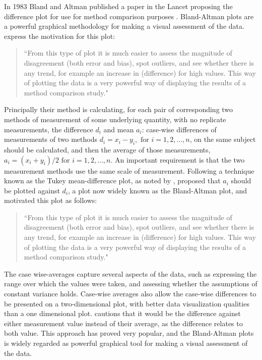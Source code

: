 \documentclass[12pt, a4paper]{report}
\theoremstyle{plain}
\theoremstyle{definition}
\theoremstyle{remark}
\begin{document}
	
In 1983 Bland and Altman published a paper in the Lancet proposing the difference plot for use for method comparison purposes \citep{BA83}. 	Bland-Altman plots are a powerful graphical methodology for making
a visual assessment of the data. \citet*{BA83} express the
motivation for this plot:
\begin{quote}
	``From this type of plot it is much easier to assess the magnitude
	of disagreement (both error and bias), spot outliers, and see
	whether there is any trend, for example an increase in
	(difference) for high values. This way of plotting the data is a
	very powerful way of displaying the results of a method comparison
	study."
\end{quote}
 Principally their method is calculating, for each pair of corresponding two methods of measurement of some underlying quantity, with no replicate measurements, the difference $d_i$ and mean $a_i$: case-wise differences of measurements of two methods $d_{i} = x_{i}-y_{i}, \mbox{ for }i=1,2,\dots,n$, on the same subject
should be calculated, and then the average of those measurements, 
$a_{i} = (x_{i} + y_{i})/2 \mbox{ for }i=1,2,\dots, n$. An important requirement is that the two measurement methods use the same scale of measurement. Following a technique known as the Tukey mean-difference plot, as noted by \citet{kozak2014including}, \citet{BA83} proposed that $a_i$ should be plotted against $d_i$, a plot now widely known as the Bland-Altman plot, and motivated this plot as follows:
	\begin{quote}
		``From this type of plot it is much easier to assess the magnitude
		of disagreement (both error and bias), spot outliers, and see
		whether there is any trend, for example an increase in (difference) for high values. This way of plotting the data is a very powerful way of displaying the results of a method comparison study."
	\end{quote}
	
	The case wise-averages capture several aspects of the data, such as expressing the range over which the values were taken, and assessing whether the assumptions of constant variance holds. Case-wise averages also allow the case-wise differences to be presented on a two-dimensional plot, with better data visualization qualities than a one dimensional plot. \citet{BA86}
	cautions that it would be the difference against either measurement value instead of their average, as the difference relates to both value. This approach has proved very popular, and the Bland-Altman plots is widely regarded as powerful graphical tool for making a visual assessment of the data.
	
\end{document}
